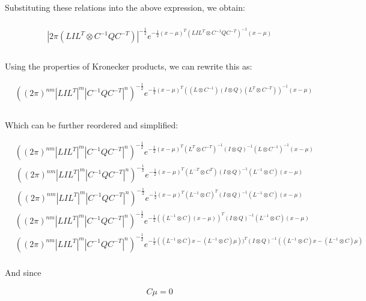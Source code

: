 Substituting these relations into the above expression, we obtain:

\begin{align*}
\\
&|2\pi(LIL^T \otimes C^{-1}QC^{-T})|^{-\frac{1}{2}}e^{-\frac{1}{2}(x-\mu)^T(LIL^T \otimes C^{-1}QC^{-T})^{-1}(x-\mu)}\\
\\
\end{align*}

Using the properties of Kronecker products, we can rewrite this as:

\begin{align*}
&((2\pi)^{nm}|LIL^T|^m |C^{-1}QC^{-T}|^n)^{-\frac{1}{2}}e^{-\frac{1}{2}(x-\mu)^T((L \otimes C^{-1})(I \otimes Q)(L^T \otimes C^{-T}))^{-1}(x-\mu)}\\
\\
\end{align*}

Which can be further reordered and simplified:

\begin{align*}
&((2\pi)^{nm}|LIL^T|^m |C^{-1}QC^{-T}|^n)^{-\frac{1}{2}}e^{-\frac{1}{2}(x-\mu)^T(L^T \otimes C^{-T})^{-1}(I \otimes Q)^{-1}(L \otimes C^{-1})^{-1}(x-\mu)}
\end{align*}
\begin{align*}
&((2\pi)^{nm}|LIL^T|^m |C^{-1}QC^{-T}|^n)^{-\frac{1}{2}}e^{-\frac{1}{2}(x-\mu)^T(L^{-T} \otimes C^{T})(I \otimes Q)^{-1}(L^{-1} \otimes C)(x-\mu)}
\end{align*}
\begin{align*}
&((2\pi)^{nm}|LIL^T|^m |C^{-1}QC^{-T}|^n)^{-\frac{1}{2}}e^{-\frac{1}{2}(x-\mu)^T(L^{-1} \otimes C)^{T}(I \otimes Q)^{-1}(L^{-1} \otimes C)(x-\mu)}
\end{align*}
\begin{align*}
&((2\pi)^{nm}|LIL^T|^m |C^{-1}QC^{-T}|^n)^{-\frac{1}{2}}e^{-\frac{1}{2}((L^{-1} \otimes C)(x-\mu))^{T}(I \otimes Q)^{-1}(L^{-1} \otimes C)(x-\mu)}
\end{align*}
\begin{align*}
&((2\pi)^{nm}|LIL^T|^m |C^{-1}QC^{-T}|^n)^{-\frac{1}{2}}e^{-\frac{1}{2}((L^{-1} \otimes C)x-(L^{-1} \otimes C)\mu))^{T}(I \otimes Q)^{-1}((L^{-1} \otimes C)x-(L^{-1} \otimes C)\mu)}\\
\end{align*}

And since

\begin{align*}
&C\mu = 0
\end{align*}

